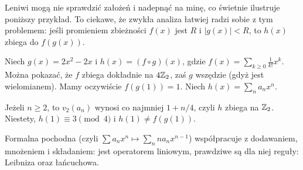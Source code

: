 Leniwi mogą nie sprawdzić założeń i nadepnąć na minę, co świetnie ilustruje poniższy przykład.
To ciekawe, że zwykła analiza łatwiej radzi sobie z tym problemem: jeśli promieniem zbieżności $f(x)$ jest $R $ i $|g(x)| < R $, to $h(x)$ zbiega do $f(g(x))$.

\begin{przyklad}\label{leniwy}
	Niech $g(x) = 2x^2 - 2x$ i $h(x) = (f \circ g)(x)$, gdzie $f(x) = \sum_{k \ge 0} \frac{1}{k!} x^k$.
	Można pokazać, że $f$ zbiega dokładnie na $4 \mathbb Z_2$, zaś $g$ wszędzie (gdyż jest wielomianem).
	Mamy oczywiście $f(g(1)) = 1$.
	Niech $h(x) = \sum_n a_n x^n$.
	
	Jeżeli $n \ge 2$, to $v_2(a_n)$ wynosi co najmniej $1 + n / 4$, czyli $h$ zbiega na $\mathbb Z_2$.
	Niestety, $h(1) \equiv 3 \pmod {4}$ i $h(1) \neq f(g(1))$.
\end{przyklad}

\begin{fakt}
	Formalna pochodna (czyli $\sum a_n x^n \mapsto \sum_n na_n x^{n-1}$) współpracuje z dodawaniem, mnożeniem i składaniem: jest operatorem liniowym, prawdziwe są dla niej reguły: Leibniza oraz łańcuchowa.
\end{fakt}